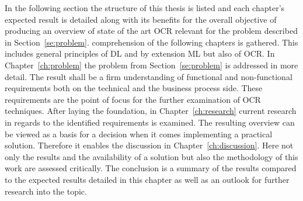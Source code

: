 In the following section the structure of this thesis is listed and each chapter's expected
result is detailed along with its benefits for the overall objective of producing an overview of
state of the art \ac{OCR} relevant for the problem described in Section~\ref{se:problem}.
comprehension of the following chapters is gathered.
This includes general principles of \ac{DL} and by extension \ac{ML} but also of \ac{OCR}.\@
In Chapter~\ref{ch:problem} the problem from Section~\ref{se:problem} is addressed in more detail.
The result shall be a firm understanding of functional and non-functional requirements both on the
technical and the business process side.
These requirements are the point of focus for the further examination of \ac{OCR} techniques.
After laying the foundation, in Chapter~\ref{ch:research} current research in regards to the
identified requirements is examined.
The resulting overview can be viewed as a basis for a decision when it comes implementing a practical
solution.
Therefore it enables the discussion in Chapter~\ref{ch:discussion}.
Here not only the results and the availability of a solution but also the methodology of this work
are assessed critically.
The conclusion is a summary of the results compared to the expected results detailed in this chapter
as well as an outlook for further research into the topic.
